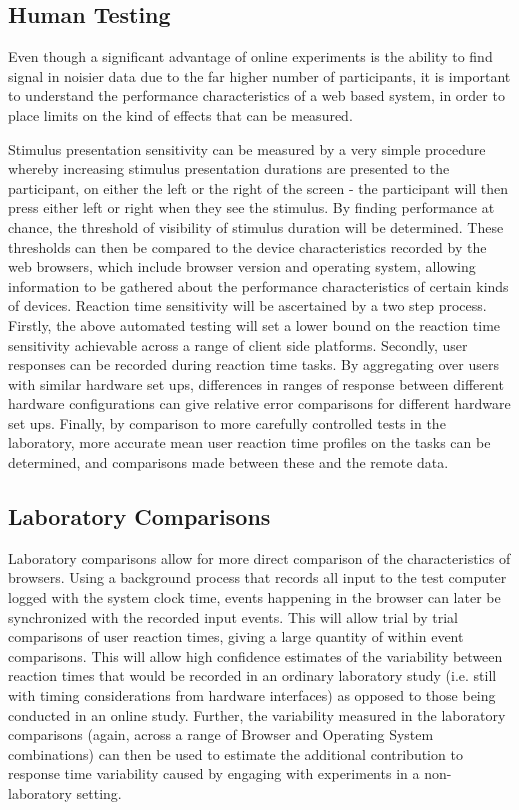 \documentclass[12pt,a4paper,titlepage]{scrreprt}
\begin{document}
\subsection{Human Testing}
Even though a significant advantage of online experiments is the ability to find signal in noisier data due to the far higher number of participants\cite{birnbaum_web-based_2001}, it is important to understand the performance characteristics of a web based system, in order to place limits on the kind of effects that can be measured. 

Stimulus presentation sensitivity can be measured by a very simple procedure whereby increasing stimulus presentation durations are presented to the participant, on either the left or the right of the screen - the participant will then press either left or right when they see the stimulus. By finding performance at chance, the threshold of visibility of stimulus duration will be determined. These thresholds can then be compared to the device characteristics recorded by the web browsers, which include browser version and operating system, allowing information to be gathered about the performance characteristics of certain kinds of devices.
Reaction time sensitivity will be ascertained by a two step process. Firstly, the above automated testing will set a lower bound on the reaction time sensitivity achievable across a range of client side platforms. Secondly, user responses can be recorded during reaction time tasks. By aggregating over users with similar hardware set ups, differences in ranges of response between different hardware configurations can give relative error comparisons for different hardware set ups. Finally, by comparison to more carefully controlled tests in the laboratory, more accurate mean user reaction time profiles on the tasks can be determined, and comparisons made between these and the remote data.
\subsection{Laboratory Comparisons}
Laboratory comparisons allow for more direct comparison of the characteristics of browsers. Using a background process that records all input to the test computer logged with the system clock time, events happening in the browser can later be synchronized with the recorded input events. This will allow trial by trial comparisons of user reaction times, giving a large quantity of within event comparisons. This will allow high confidence estimates of the variability between reaction times that would be recorded in an ordinary laboratory study (i.e. still with timing considerations from hardware interfaces) as opposed to those being conducted in an online study. Further, the variability measured in the laboratory comparisons (again, across a range of Browser and Operating System combinations) can then be used to estimate the additional contribution to response time variability caused by engaging with experiments in a non-laboratory setting.
\end{document}
